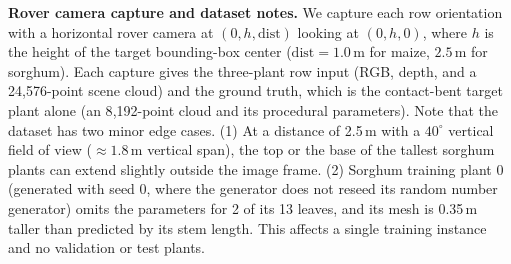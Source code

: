 \documentclass[10pt,twocolumn,letterpaper]{article}
\begin{document}
\begin{table}[t!]
  \caption{\textbf{Crop row contact-solver convergence statistics.} ``Bent'' denotes the orientations where at least one target leaf bent, and ``Rolled'' denotes the orientations where at least one neighbor leaf rolled. No orientation failed, and the final exact triangle-triangle pass of the solver found no inter-plant crossings.}
  \label{tab:supp-rowstats}\label{tab:supp-row_stats}
  \centering\scriptsize
  \setlength{\tabcolsep}{2pt}
\end{table}

\noindent\textbf{Rover camera capture and dataset notes.}
We capture each row orientation with a horizontal rover camera at $(0, h, \mathrm{dist})$ looking at $(0, h, 0)$, where $h$ is the height of the target bounding-box center ($\mathrm{dist} = 1.0$\,m for maize, $2.5$\,m for sorghum). Each capture gives the three-plant row input (RGB, depth, and a 24{,}576-point scene cloud) and the ground truth, which is the contact-bent target plant alone (an 8{,}192-point cloud and its procedural parameters). Note that the dataset has two minor edge cases. (1) At a distance of 2.5\,m with a $40^\circ$ vertical field of view ($\approx 1.8$\,m vertical span), the top or the base of the tallest sorghum plants can extend slightly outside the image frame. (2) Sorghum training plant 0 (generated with seed 0, where the generator does not reseed its random number generator) omits the parameters for 2 of its 13 leaves, and its mesh is 0.35\,m taller than predicted by its stem length. This affects a single training instance and no validation or test plants.
\end{document}

